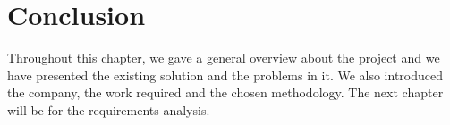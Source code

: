 \section*{Conclusion}
Throughout this chapter, we gave a general overview about the project and we have
presented the existing solution and the problems in it. We also introduced the company, the work required and
the chosen methodology. The next chapter will be for the requirements analysis.